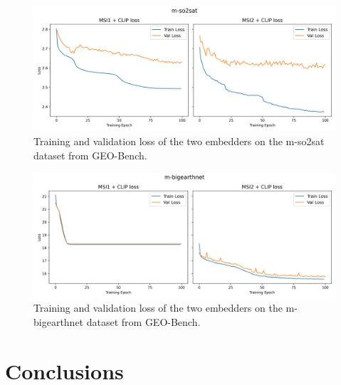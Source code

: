\documentclass[a4paper, oneside, english]{sapthesis} %
\begin{document}
\vspace{-0.5cm}

\begin{figure}[h]
    \centering
    \includegraphics[width=\textwidth]{img/m-so2sat_loss_plot.png}
    \caption{Training and validation loss of the two embedders on the m-so2sat dataset from GEO-Bench.}
    \label{fig:so2satloss}
\end{figure}

\vspace{-0.5cm}

\begin{figure}[h]
    \centering
    \includegraphics[width=\textwidth]{img/m-bigearthnet_loss_plot.png}
    \caption{Training and validation loss of the two embedders on the m-bigearthnet dataset from GEO-Bench.}
    \label{fig:benloss}
\end{figure}



\chapter{Conclusions} %
\end{document}
